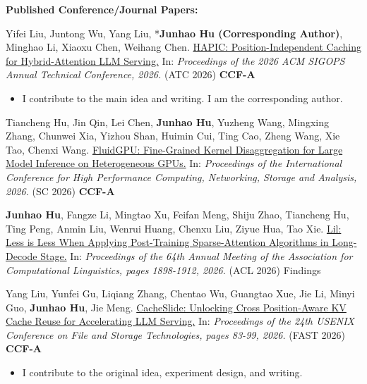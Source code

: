 \textbf{Published Conference/Journal Papers:}
\begin{enumerate}[label={[\arabic*]}]
    \item Yifei Liu, Juntong Wu, Yang Liu, *\textbf{Junhao Hu (Corresponding Author)}, Minghao Li, Xiaoxu Chen, Weihang Chen. \href{https://arxiv.org/abs/2607.01299}{\color{cyan} HAPIC: Position-Independent Caching for Hybrid-Attention LLM Serving.} In: \textit{Proceedings of the 2026 ACM SIGOPS Annual Technical Conference, 2026.} (ATC 2026) \textbf{CCF-A}
    \begin{itemize}
        \item I contribute to the main idea and writing. I am the corresponding author.
    \end{itemize}

    \item Tiancheng Hu, Jin Qin, Lei Chen, \textbf{Junhao Hu}, Yuzheng Wang, Mingxing Zhang, Chunwei Xia, Yizhou Shan, Huimin Cui, Ting Cao, Zheng Wang, Xie Tao, Chenxi Wang. \href{}{\color{cyan} FluidGPU: Fine-Grained Kernel Disaggregation for Large Model Inference on Heterogeneous GPUs.} In: \textit{Proceedings of the International Conference for High Performance Computing, Networking, Storage and Analysis, 2026.} (SC 2026) \textbf{CCF-A}
    
    \item \textbf{Junhao Hu}, Fangze Li, Mingtao Xu, Feifan Meng, Shiju Zhao, Tiancheng Hu, Ting Peng, Anmin Liu, Wenrui Huang, Chenxu Liu, Ziyue Hua, Tao Xie. \href{https://aclanthology.org/2026.findings-acl.91/}{\color{cyan} Lil: Less is Less When Applying Post-Training Sparse-Attention Algorithms in Long-Decode Stage.} In: \textit{Proceedings of the 64th Annual Meeting of the Association for Computational Linguistics, pages 1898-1912, 2026.} (ACL 2026) Findings
    
    \item Yang Liu, Yunfei Gu, Liqiang Zhang, Chentao Wu, Guangtao Xue, Jie Li, Minyi Guo, \textbf{Junhao Hu}, Jie Meng. \href{https://www.usenix.org/conference/fast26/presentation/liu-yang}{\color{cyan} CacheSlide: Unlocking Cross Position-Aware KV Cache Reuse for Accelerating LLM Serving.} In: \textit{Proceedings of the 24th USENIX Conference on File and Storage Technologies, pages 83-99, 2026.} (FAST 2026) \textbf{CCF-A}
    \begin{itemize}
        \item I contribute to the original idea, experiment design, and writing.
    \end{itemize}



\end{enumerate}
